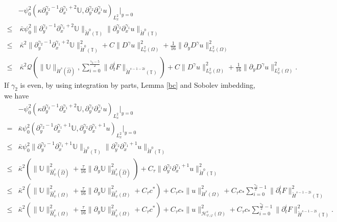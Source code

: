 \documentclass{amsart}
\numberwithin{equation}{section}
\begin{document}
\begin{align}\label{I6c232}
&-\psi_{0}^{2}(\kappa\partial_{y}^{\gamma_{2}-1}\partial_{x}^{\gamma_{1}+2}\mathbb{U},\partial_{y}^{\gamma_{2}}\partial_{x}^{\gamma_{1}}u)_{L_{x}^{2}}|_{y=0}\\
\leq&~\bar{\kappa}\psi_{0}^{2}\|\partial_{y}^{\gamma_{2}-1}\partial_{x}^{\gamma_{1}+2}\mathbb{U}\|_{\mathring{H}^{0}(\mathbb{T})}
                      \|\partial_{y}^{\gamma_{2}}\partial_{x}^{\gamma_{1}}u\|_{\mathring{H}^{0}(\mathbb{T})}\nonumber\\
\leq&~\bar{\kappa}^{2}\|\partial_{y}^{\gamma_{2}-1}\partial_{x}^{\gamma_{1}+2}\mathbb{U}\|_{\mathring{H}^{0}(\mathbb{T})}^{2}
     +C\|D^{\gamma}u\|_{L_{\psi}^{2}(\Omega)}^{2}
     +\frac{1}{16}\|\partial_{y}D^{\gamma}u\|_{L_{\psi}^{2}(\Omega)}^{2}\nonumber\\
\leq&~\bar{\kappa}^{2}
      \mathcal{Q}\left(\|\mathbb{U}\|_{\ddot{H}^{s}(\hat{\Omega})},
                       \sum_{i=0}^{\frac{\gamma_{2}-5}{2}}\|\partial_{t}^{i}F\|_{\mathring{H}^{s-1-2i}(\mathbb{T})}\right)
     +C\|D^{\gamma}u\|_{L_{\psi}^{2}(\Omega)}^{2}
     +\frac{1}{16}\|\partial_{y}D^{\gamma}u\|_{L_{\psi}^{2}(\Omega)}^{2}.\nonumber
\end{align}
If $\gamma_{2}$ is even, by using integration by parts, Lemma \ref{bc} and Sobolev imbedding, we have
\begin{align}\label{I6c233}
&-\psi_{0}^{2}(\kappa\partial_{y}^{\gamma_{2}-1}\partial_{x}^{\gamma_{1}+2}\mathbb{U},\partial_{y}^{\gamma_{2}}\partial_{x}^{\gamma_{1}}u)_{L_{x}^{2}}|_{y=0}\\
=&\bar{\kappa}\psi_{0}^{2}(\partial_{y}^{\gamma_{2}-1}\partial_{x}^{\gamma_{1}+1}\mathbb{U},\partial_{y}^{\gamma_{2}}\partial_{x}^{\gamma_{1}+1}u)_{L_{x}^{2}}|_{y=0}\nonumber\\
\leq& \bar{\kappa}\psi_{0}^{2}\|\partial_{y}^{\gamma_{2}-1}\partial_{x}^{\gamma_{1}+1}\mathbb{U}\|_{\mathring{H}^{0}(\mathbb{T})}
                      \|\partial_{y}^{\gamma_{2}}\partial_{x}^{\gamma_{1}+1}u\|_{\mathring{H}^{0}(\mathbb{T})}\nonumber\\
\leq& \bar{\kappa}^{2}\left(\|\mathbb{U}\|_{\hat{H}_{\psi}^{s}(\hat{\Omega})}^{2}
                +\frac{\tau}{16}\|\partial_{y}\mathbb{U}\|_{\hat{H}_{\psi}^{s}(\hat{\Omega})}^{2}\right)
     +C_{\tau}\|\partial_{y}^{\gamma_{2}}\partial_{x}^{\gamma_{1}+1}u\|_{\mathring{H}^{0}(\mathbb{T})}^{2}\nonumber\\
\leq& \bar{\kappa}^{2}\left(\|\mathbb{U}\|_{\hat{H}_{\psi}^{s}(\Omega)}^{2}
                +\frac{\tau}{16}\|\partial_{y}\mathbb{U}\|_{\hat{H}_{\psi}^{s}(\Omega)}^{2}+C_{\tau}c^{*}\right)
     +C_{\tau}c_{*}\|u\|_{\ddot{H}^{s}(\Omega)}^{2}
     +C_{\tau}c_{*}\sum_{i=0}^{\frac{\gamma_{2}}{2}-1}\|\partial_{t}^{i}F\|_{\mathring{H}^{s-1-2i}(\mathbb{T})}^{2}\nonumber\\
\leq& \bar{\kappa}^{2}\left(\|\mathbb{U}\|_{\hat{H}_{\psi}^{s}(\Omega)}^{2}
                +\frac{\tau}{16}\|\partial_{y}\mathbb{U}\|_{\hat{H}_{\psi}^{s}(\Omega)}^{2}+C_{\tau}c^{*}\right)
     +C_{\tau}c_{*}\|u\|_{\mathcal{H}_{\psi,\varphi}^{s}(\Omega)}^{2}
     +C_{\tau}c_{*}\sum_{i=0}^{\frac{\gamma_{2}}{2}-1}\|\partial_{t}^{i}F\|_{\mathring{H}^{s-1-2i}(\mathbb{T})}^{2}\nonumber.
\end{align}
\end{document}
